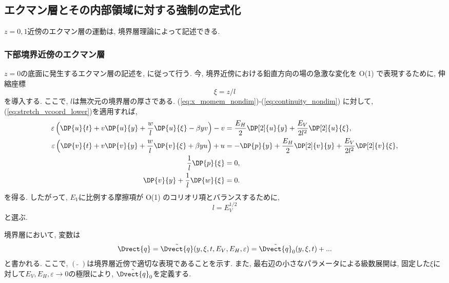 \subsection{エクマン層とその内部領域に対する強制の定式化}
$z=0,1$近傍のエクマン層の運動は, 境界層理論によって記述できる. 

\subsubsection*{下部境界近傍のエクマン層}
$z=0$の底面に発生するエクマン層の記述を, \citet[section 4.5]{pedlosky1987geophysical} に従って行う. 
今, 境界近傍における鉛直方向の場の急激な変化を O(1) で表現するために, 
伸縮座標
\begin{equation}
  \xi = z/l 
\label{eq:stretch_vcoord_lower}
\end{equation}
を導入する. 
ここで, $l$は無次元の境界層の厚さである. 
(\ref{eq:x_momem_nondim})-(\ref{eq:continuity_nondim}) に対して, 
(\ref{eq:stretch_vcoord_lower})を適用すれば, 
\begin{subequations}
\begin{align}
  \varepsilon \left( \DP{u}{t} + v\DP{u}{y} + \dfrac{w}{l}\DP{u}{\xi} - \beta y v \right) - v 
       &= \dfrac{E_H}{2} \DP[2]{u}{y} + \dfrac{E_V}{2l^2} \DP[2]{u}{\xi}, \label{eq:x_momem_nondim_lowEkman} \\
  \varepsilon \left( \DP{v}{t} + v\DP{v}{y} + \dfrac{w}{l}\DP{v}{\xi} + \beta y u \right) + u 
       &= - \DP{p}{y} + \dfrac{E_H}{2} \DP[2]{v}{y} + \dfrac{E_V}{2l^2} \DP[2]{v}{\xi}, \label{eq:y_momem_nondim_lowEkman} \\
  \dfrac{1}{l}\DP{p}{\xi} &= 0, \label{eq:hydrostatic_nondim_lowEkman} \\
  \DP{v}{y} + \dfrac{1}{l} \DP{w}{\xi} &= 0. \label{eq:continuity_nondim_lowEkman}
\end{align}
\end{subequations}
を得る. 
したがって, $E_V$に比例する摩擦項が O(1) のコリオリ項とバランスするために, 
\begin{equation}
  l = E_V^{1/2}
\end{equation}
と選ぶ. 

境界層において, 変数は
\begin{equation}
  \Dvect{q} = \tilde{\Dvect{q}}(y,\xi,t,E_V,E_H,\varepsilon)
  = \tilde{\Dvect{q}}_0 (y,\xi,t) + ...
\label{eq:variable_expand_lowEkman}
\end{equation}
と書かれる. 
ここで, $(\tilde{\;\;})$は境界層近傍で適切な表現であることを示す. 
また, 最右辺の小さなパラメータによる級数展開は, 
固定した$\xi$に対して$E_V, E_H, \varepsilon \to 0$の極限により, 
$\tilde{\Dvect{q}}_0$を定義する. 


